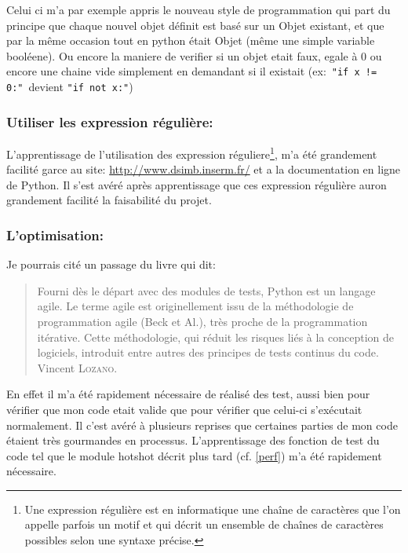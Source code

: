 Celui ci m'a par exemple appris le nouveau style de programmation qui part du principe que chaque nouvel objet définit est basé sur un Objet existant, et que par la même occasion tout en python était Objet (même une simple variable booléene). Ou encore la maniere de verifier si un objet etait faux, egale à 0 ou encore une chaine vide simplement en demandant si il existait (ex:~\texttt{"if x != 0:"}~devient \texttt{"if not x:"})

        \subsubsection{Utiliser les expression régulière:} 
L'apprentissage de l'utilisation des expression réguliere\footnote{Une expression régulière
 est en informatique une chaîne de caractères que l’on appelle parfois un motif et qui décrit un ensemble de chaînes de caractères possibles selon une syntaxe précise.}, m'a été grandement facilité garce au site: \url{http://www.dsimb.inserm.fr/}\cite{re} et a la documentation en ligne de Python\cite{pydoc}. Il s'est avéré après apprentissage que ces expression régulière auron grandement facilité la faisabilité du projet.

        \subsubsection{L'optimisation:}
Je pourrais cité un passage du livre qui dit:
\begin{quotation}
    Fourni dès le départ avec des modules de tests, Python est un langage agile. Le terme agile est originellement issu de la méthodologie de programmation agile (Beck et Al.), très proche de la programmation itérative. Cette méthodologie, qui réduit les risques liés à la conception de logiciels, introduit entre autres des principes de tests continus du code.
    \raggedleft Vincent \textsc{Lozano}.
\end{quotation}

En effet il m'a été rapidement nécessaire de réalisé des test, aussi bien pour vérifier que mon code etait valide que pour vérifier que celui-ci s’exécutait normalement. Il c'est avéré à plusieurs reprises que certaines parties de mon code étaient très gourmandes en processus. L’apprentissage des fonction de test du code tel que le module hotshot décrit plus tard (cf. \vref{perf}) m'a été rapidement nécessaire.

